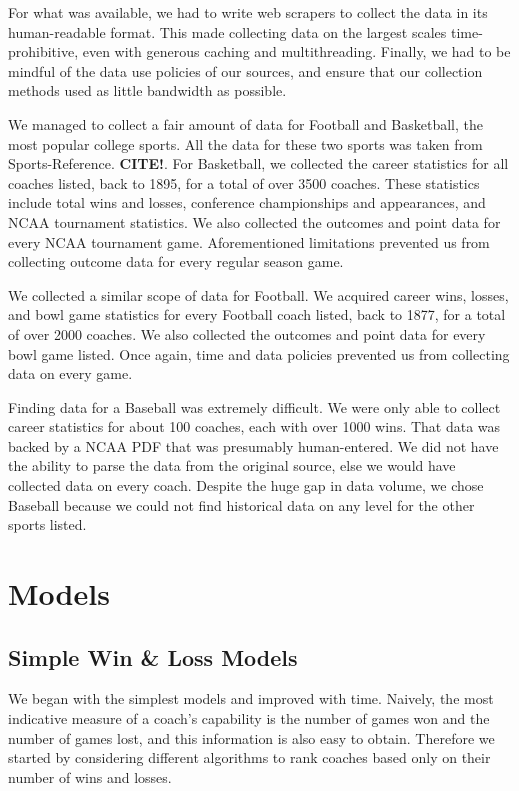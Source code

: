 \documentclass[titlepage]{article}
\begin{document}
For what was available, we had to write web scrapers to collect the data in its human-readable format. This made collecting data on the largest scales time-prohibitive, even with generous caching and multithreading. Finally, we had to be mindful of the data use policies of our sources, and ensure that our collection methods used as little bandwidth as possible.

We managed to collect a fair amount of data for Football and Basketball, the most popular college sports. All the data for these two sports was taken from Sports-Reference. \textbf{CITE!}. For Basketball, we collected the career statistics for all coaches listed, back to 1895, for a total of over 3500 coaches. These statistics include total wins and losses, conference championships and appearances, and NCAA tournament statistics. We also collected the outcomes and point data for every NCAA tournament game. Aforementioned limitations prevented us from collecting outcome data for every regular season game. 

We collected a similar scope of data for Football. We acquired career wins, losses, and bowl game statistics for every Football coach listed, back to 1877, for a total of over 2000 coaches. We also collected the outcomes and point data for every bowl game listed. Once again, time and data policies prevented us from collecting data on every game.

Finding data for a Baseball was extremely difficult. We were only able to collect career statistics for about 100 coaches, each with over 1000 wins. That data was backed by a NCAA PDF that was presumably human-entered. We did not have the ability to parse the data from the original source, else we would have collected data on every coach. Despite the huge gap in data volume, we chose Baseball because we could not find historical data on any level for the other sports listed.

\section{Models}

\subsection{Simple Win \& Loss Models}

We began with the simplest models and improved with time. Naively, the most indicative measure of a coach's capability is the number of games won and the number of games lost, and this information is also easy to obtain. Therefore we started by considering different algorithms to rank coaches based only on their number of wins and losses.
\end{document}
